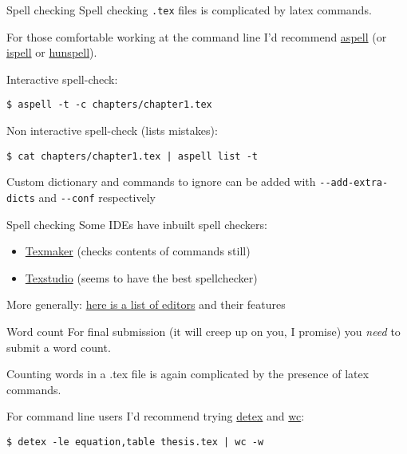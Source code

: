 \begin{frame}[fragile]{Spell checking}
  Spell checking \texttt{.tex} files is complicated by latex commands.

  For those comfortable working at the command line I'd recommend
  \href{http://aspell.net/}{aspell} 
  (or \href{https://www.gnu.org/software/ispell/}{ispell}
  or \href{http://hunspell.github.io/}{hunspell}).

  Interactive spell-check:
  \begin{lstlisting}
$ aspell -t -c chapters/chapter1.tex
  \end{lstlisting}
  Non interactive spell-check (lists mistakes):
  \begin{lstlisting}
$ cat chapters/chapter1.tex | aspell list -t
  \end{lstlisting}%
  Custom dictionary and commands to ignore can be added with
  \lstinline|--add-extra-dicts| and \lstinline|--conf| respectively
\end{frame}

\begin{frame}[fragile]{Spell checking}
  Some IDEs have inbuilt spell checkers:
  \begin{itemize}
    \item \href{http://www.xm1math.net/texmaker/}{Texmaker}
      (checks contents of commands still)
    \item \href{https://www.texstudio.org/}{Texstudio} (seems to have the best
       spellchecker)
  \end{itemize}
  More generally:
  \href{https://tex.stackexchange.com/questions/339/latex-editors-ides}%
  {here is a list of editors} and their features
\end{frame}

\begin{frame}[fragile]{Word count}
  For final submission (it will creep up on you, I promise) you \textsl{need}
  to submit a word count.

  Counting words in a .tex file is again complicated by the presence of latex
  commands.

  For command line users I'd recommend trying
  \href{https://www.freebsd.org/cgi/man.cgi?query=detex}{detex} and 
  \href{http://pubs.opengroup.org/onlinepubs/9699919799/utilities/wc.html}{wc}:
  \begin{lstlisting}
$ detex -le equation,table thesis.tex | wc -w
  \end{lstlisting}
\end{frame}

